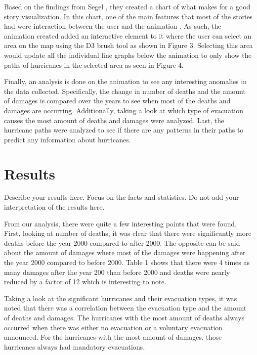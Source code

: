 Based on the findings from Segel \etal, they created a chart of what makes for a good story visualization. In this chart, one of the main features that most of the stories had were interaction between the user and the animation \cite{segel2010narrative}. As such, the animation created added an interactive element to it where the user can select an area on the map using the D3 brush tool as shown in Figure 3. Selecting this area would update all the individual line graphs below the animation to only show the paths of hurricanes in the selected area as seen in Figure 4. 

\brush
\multipleViews

Finally, an analysis is done on the animation to see any interesting anomalies in the data collected. Specifically, the change in number of deaths and the amount of damages is compared over the years to see when most of the deaths and damages are occurring. Additionally, taking a look at which type of evacuation causes the most amount of deaths and damages were analyzed. Last, the hurricane paths were analyzed to see if there are any patterns in their paths to predict any information about hurricanes. 

\section{Results}
Describe your results here. Focus on the facts and statistics. Do not add your interpretation of the results here.

From our analysis, there were quite a few interesting points that were found. First, looking at number of deaths, it was clear that there were significantly more deaths before the year 2000 compared to after 2000. The opposite can be said about the amount of damages where most of the damages were happening after the year 2000 compared to before 2000. Table 1 shows that there were 4 times as many damages after the year 200 than before 2000 and deaths were nearly reduced by a factor of 12 which is interesting to note.

\deathsDamagesTable

Taking a look at the significant hurricanes and their evacuation types, it was noted that there was a correlation between the evacuation type and the amount of deaths and damages. The hurricanes with the most amount of deaths always occurred when there was either no evacuation or a voluntary evacuation announced. For the hurricanes with the most amount of damages, those hurricanes always had mandatory evacuations.

